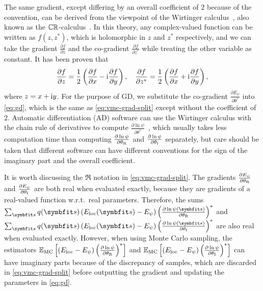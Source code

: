The same gradient, except differing by an overall coefficient of $2$ because of the convention, can be derived from the viewpoint of the Wirtinger calculus~\cite{wirtinger1927formalen}, also known as the $\mathbb{C} \mathbb{R}$-calculus~\cite{kreutz2009complex}. In this theory, any complex-valued function can be written as $f(z, z^*)$, which is holomorphic in $z$ and $z^*$ respectively, and we can take the gradient $\frac{\partial f}{\partial z}$ and the co-gradient $\frac{\partial f}{\partial z^*}$ while treating the other variable as constant. It has been proven that
\begin{equation}
\frac{\partial f}{\partial z} = \frac{1}{2} \left( \frac{\partial f}{\partial x} - \mathrm{i} \frac{\partial f}{\partial y} \right), \quad
\frac{\partial f}{\partial z^*} = \frac{1}{2} \left( \frac{\partial f}{\partial x} + \mathrm{i} \frac{\partial f}{\partial y} \right),
\end{equation}
where $z = x + \mathrm{i} y$. For the purpose of GD, we substitute the co-gradient $\frac{\partial E_\psi}{\partial \theta^*}$ into \cref{eq:gd}, which is the same as \cref{eq:vmc-grad-split} except without the coefficient of $2$. Automatic differentiation (AD) software can use the Wirtinger calculus with the chain rule of derivatives to compute $\frac{\partial \ln \psi}{\partial \theta^*}$~\cite{kramer2024tutorial}, which usually takes less computation time than computing $\frac{\partial \ln \psi}{\partial {\theta_\text{R}}}$ and $\frac{\partial \ln \psi}{\partial {\theta_\text{I}}}$ separately, but care should be taken that different software can have different conventions for the sign of the imaginary part and the overall coefficient.

It is worth discussing the $\Re$ notation in \cref{eq:vmc-grad-split}. The gradients $\frac{\partial E_\psi}{\partial {\theta_\text{R}}}$ and $\frac{\partial E_\psi}{\partial {\theta_\text{I}}}$ are both real when evaluated exactly, because they are gradients of a real-valued function w.r.t.\ real parameters. Therefore, the sums $\sum_\vs q(\vs) \left( E_\text{loc}(\vs) - E_\psi \right) \left( \frac{\partial \ln \psi(\vs)}{\partial \thetar} \right)^*$ and $\sum_\vs q(\vs) \left( E_\text{loc}(\vs) - E_\psi \right) \left( \frac{\partial \ln \psi(\vs)}{\partial \thetai} \right)^*$ are also real when evaluated exactly. However, when using Monte Carlo sampling, the estimators $\mathbb{E}_\text{MC}\left[ \left( E_\text{loc} - E_\psi \right) \left( \frac{\partial \ln \psi}{\partial {\theta_\text{R}}} \right)^* \right]$ and $\mathbb{E}_\text{MC}\left[ \left( E_\text{loc} - E_\psi \right) \left( \frac{\partial \ln \psi}{\partial {\theta_\text{I}}} \right)^* \right]$ can have imaginary parts because of the discrepancy of samples, which are discarded in \cref{eq:vmc-grad-split} before outputting the gradient and updating the parameters in \cref{eq:gd}.

